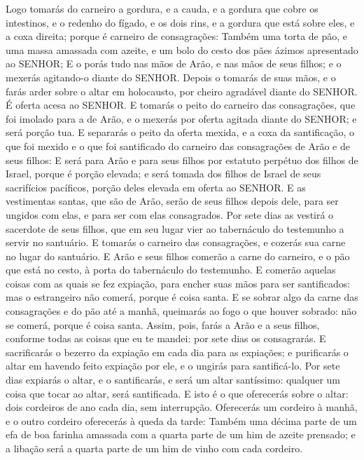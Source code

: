 {Logo tomarás do carneiro a gordura, e a cauda, e a gordura que cobre os intestinos, e o redenho do fígado, e os dois rins, e a gordura que está sobre eles, e a coxa direita; porque é carneiro de consagrações:
Também uma torta de pão, e uma massa amassada com azeite, e um bolo do cesto dos pães ázimos apresentado ao SENHOR;
E o porás tudo nas mãos de Arão, e nas mãos de seus filhos; e o mexerás agitando-o diante do SENHOR.
Depois o tomarás de suas mãos, e o farás arder sobre o altar em holocausto, por cheiro agradável diante do SENHOR. É oferta acesa ao SENHOR.
E tomarás o peito do carneiro das consagrações, que foi imolado para a de Arão, e o mexerás por oferta agitada diante do SENHOR; e será porção tua.
E separarás o peito da oferta mexida, e a coxa da santificação, o que foi mexido e o que foi santificado do carneiro das consagrações de Arão e de seus filhos:
E será para Arão e para seus filhos por estatuto perpétuo dos filhos de Israel, porque é porção elevada; e será tomada dos filhos de Israel de seus sacrifícios pacíficos, porção deles elevada em oferta ao SENHOR.
E as vestimentas santas, que são de Arão, serão de seus filhos depois dele, para ser ungidos com elas, e para ser com elas consagrados.
Por sete dias as vestirá o sacerdote de seus filhos, que em seu lugar vier ao tabernáculo do testemunho a servir no santuário.
E tomarás o carneiro das consagrações, e cozerás sua carne no lugar do santuário.
E Arão e seus filhos comerão a carne do carneiro, e o pão que está no cesto, à porta do tabernáculo do testemunho.
E comerão aquelas coisas com as quais se fez expiação, para encher suas mãos para ser santificados: mas o estrangeiro não comerá, porque é coisa santa.
E se sobrar algo da carne das consagrações e do pão até a manhã, queimarás ao fogo o que houver sobrado: não se comerá, porque é coisa santa.
Assim, pois, farás a Arão e a seus filhos, conforme todas as coisas que eu te mandei: por sete dias os consagrarás.
E sacrificarás o bezerro da expiação em cada dia para as expiações; e purificarás o altar em havendo feito expiação por ele, e o ungirás para santificá-lo.
Por sete dias expiarás o altar, e o santificarás, e será um altar santíssimo: qualquer um coisa que tocar ao altar, será santificada.
E isto é o que oferecerás sobre o altar: dois cordeiros de ano cada dia, sem interrupção.
Oferecerás um cordeiro à manhã, e o outro cordeiro oferecerás à queda da tarde:
Também uma décima parte de um efa de boa farinha amassada com a quarta parte de um him de azeite prensado; e a libação será a quarta parte de um him de vinho com cada cordeiro.
}
